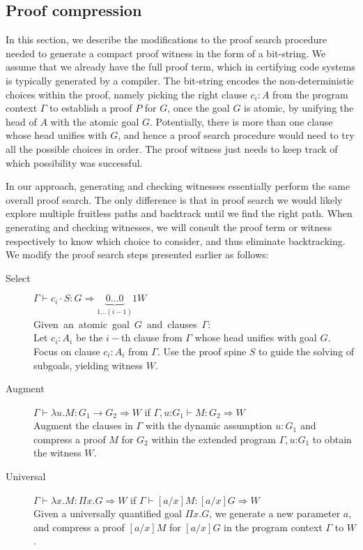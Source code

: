 \documentclass{llncs}
\newcommand{\vd}{\vdash}
\newcommand{\arrow}{\rightarrow}
\newcommand{\oftp}{\mathord{:}}
\begin{document}
\subsection{Proof compression}
In this section, we describe the modifications to the proof search
procedure needed to generate a compact proof witness in the form of a
bit-string.  We assume that we already have the full proof term, which
in certifying code systems is typically generated by a compiler.
The bit-string encodes the non-deterministic choices within the proof,
namely picking the right clause $c_i{:}A$ from the program context
$\Gamma$ to establish a proof $P$ for $G$, once the goal $G$ is
atomic, by unifying the head of $A$ with the atomic goal
$G$. Potentially, there is more than one clause whose head unifies
with $G$, and hence a proof search procedure would need to try all the
possible choices in order. The proof witness just needs to keep track
of which possibility was successful.

In our approach, generating and checking witnesses essentially perform
the same overall proof search. The only difference is that in proof
search we would likely explore multiple fruitless paths and
backtrack until we find the right path. When generating and
checking witnesses, we will consult the proof term or witness
respectively to know which choice to consider, and thus eliminate
backtracking.  We modify the proof search steps presented earlier  
as follows:
\begin{small}
\begin{description}
\item[Select] $\Gamma \vd c_i \cdot S: G \Rightarrow
  \underset{1 \ldots (i-1)}{\underbrace{0\ldots 0}}1
W $ \\
    \mbox{Given an atomic goal $G$ and clauses $\Gamma$:}\hfill\\
     Let $c_i : A_i$ be the $i-$th clause from $\Gamma$ whose head 
     unifies with goal $G$.\\
    Focus on clause $c_i : A_i$ from $\Gamma$. Use the proof spine $S$ 
    to guide the solving of subgoals, yielding witness $W$.

\item[Augment] $\Gamma \vd   \lambda u. M : G_1 \arrow G_2 \Rightarrow
  W$ if $\Gamma,
  u\oftp G_1 \vd M : G_2 \Rightarrow W$ \\
Augment the clauses in $\Gamma$ with the dynamic assumption $u{:} G_1$ and
compress a proof $M$ for $G_2$ within the extended program
$\Gamma, u \oftp G_1$ to obtain the witness $W$. 

\item[Universal] $\Gamma \vd  \lambda x. M : \Pi x. G \Rightarrow W$ if $\Gamma \vd
  [a/x]M: [a/x]G\Rightarrow W$  \\ %
Given a universally quantified goal $\Pi x. G$, we generate a new
parameter $a$, and compress a proof $[a/x]M$  for $[a/x]G$ in the
program context $\Gamma$ to $W$.

\end{description}
\end{small}    
\end{document}
